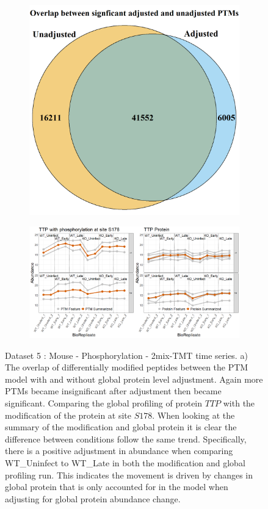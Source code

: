 \documentclass[mcp]{article}
\numberwithin{table}{section}
\begin{document}
\begin{figure}[h!]
\centering
\begin{subfigure}{\textwidth}
 \centering
\includegraphics[height=.5\textwidth]{images/shig_venn_diagramm.png}
\caption{}
\label{fig:data5_venn_diagram}
 \end{subfigure}
 \begin{subfigure}{\textwidth}
 \centering
	\includegraphics[width=1.0\textwidth]{images/No_Difference_Shigella_Profile_Plot}
	\caption{}
	\label{fig:data5_profile_plot}
	 \end{subfigure}
\caption{Dataset 5 : Mouse - Phosphorylation - 2mix-TMT time series. a) The overlap of differentially modified peptides between the PTM model with and without global protein level adjustment. Again more PTMs became insignificant after adjustment then became significant. Comparing the global profiling of protein $TTP$ with the modification of the protein at site $S178$. When looking at the summary of the modification and global protein it is clear the difference between conditions follow the same trend. Specifically, there is a positive adjustment in abundance when comparing WT\_Uninfect to WT\_Late in both the modification and global profiling run. This indicates the movement is driven by changes in global protein that is only accounted for in the model when adjusting for global protein abundance change.}
\label{fig:data5_plots}
\end{figure}
\end{document}
